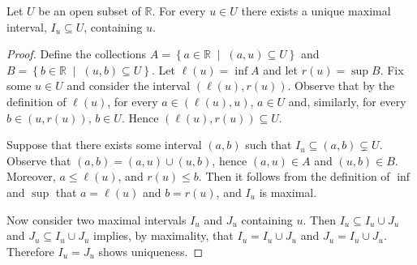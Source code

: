 \documentclass[12pt]{amsart}
\begin{document}
\begin{lem}\label{maxint}
  Let $U$ be an open subset of $\mathbb{R}$.  For every $u \in U$ there exists a unique maximal interval, $I_u \subseteq U$, containing $u$.
  \begin{proof}
    Define the collections $A = \left\{a \in \mathbb{R} \;\middle\vert\; (a,u) \subseteq U \right\}$ and $B = \left\{ b \in \mathbb{R} \;\middle\vert\; (u,b) \subseteq U \right\}$.
    Let $\ell(u) = \inf A$ and let $r(u) = \sup B$.
    Fix some $u \in U$ and consider the interval $(\ell(u), r(u))$.  
    Observe that by the definition of $\ell(u)$, for every $a \in (\ell(u), u)$, $a \in U$ and, similarly, for every $b \in (u, r(u))$, $b \in U$.
    Hence $(\ell(u), r(u)) \subseteq U$.
    
    Suppose that there exists some interval $(a,b)$ such that $I_u \subseteq (a,b) \subsetneq U$.
    Observe that $(a,b) = (a,u) \cup (u, b)$, hence $(a,u) \in A$ and $(u,b) \in B$.
    Moreover, $a \leq \ell(u)$, and $r(u) \leq b$.
    Then it follows from the definition of $\inf$ and $\sup$ that $a = \ell(u)$ and $b = r(u)$, and $I_u$ is maximal.

    Now consider two maximal intervals $I_u$ and $J_u$ containing $u$.
    Then $I_u \subseteq I_u \cup J_u$ and $J_u \subseteq I_u \cup J_u$ implies, by maximality, that $I_u = I_u \cup J_u$ and $J_u = I_u \cup J_u$.
    Therefore $I_u = J_u$ shows uniqueness.
  \end{proof}
  
\end{lem}
\end{document}
